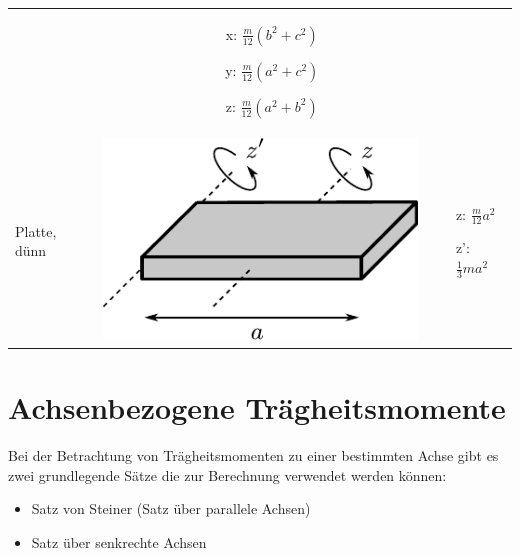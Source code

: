 \begin{table}[h!]
\begin{tabular}{m{2cm} c m{}}
\begin{minipage}{0.3\textwidth}
	\end{minipage} &
		\begin{itemize}
		\item[x:] $\frac{m}{12} \left(b^2 + c^2\right)$
		\item[y:] $\frac{m}{12} \left(a^2 + c^2\right)$
		\item[z:] $\frac{m}{12} \left(a^2 + b^2\right)$
		\end{itemize} \\
Platte, dünn &
	\begin{minipage}{0.3\textwidth}
	\includegraphics[scale=\traegscale]{../fig/traeg-platte.pdf}
	\end{minipage} &
		\begin{itemize}
		\item[z:] $\frac{m}{12} a^2$
		\item[z':] $\frac{1}{3} ma^2$
		\end{itemize} \\
\end{tabular}
\end{table}

\newpage
\section{Achsenbezogene Trägheitsmomente}
Bei der Betrachtung von Trägheitsmomenten zu einer bestimmten Achse gibt 
es zwei grundlegende Sätze die zur Berechnung verwendet werden können:

\begin{itemize}
	\item Satz von Steiner (Satz über parallele Achsen)
	\item Satz über senkrechte Achsen
\end{itemize}

